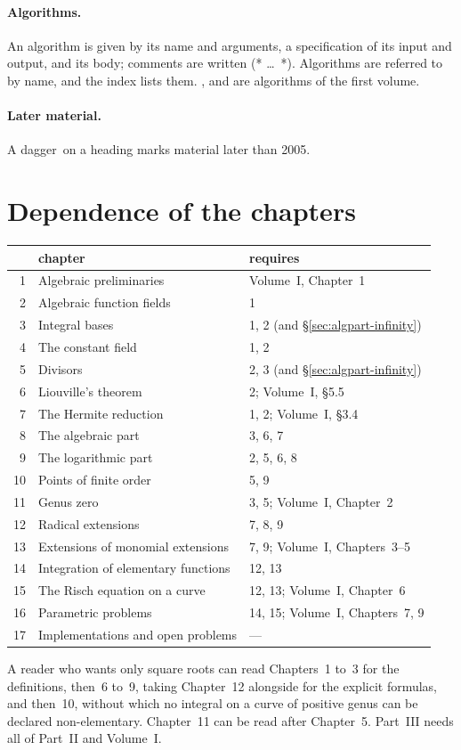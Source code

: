 \paragraph{Algorithms.} An algorithm is given by its name and arguments, a
specification of its input and output, and its body; comments are written
\textup{(* \dots\ *)}. Algorithms are referred to by name, and the index lists
them. ,  and
 are algorithms of the first volume.

\paragraph{Later material.} A dagger\later\ on a heading marks material later
than 2005.

\section*{Dependence of the chapters}

\begin{center}
\begin{tabular}{@{}rll@{}}
\toprule
 & chapter & requires \\
\midrule
1 & Algebraic preliminaries & Volume~I, Chapter~1 \\
2 & Algebraic function fields & 1 \\
3 & Integral bases & 1, 2 (and \S\ref{sec:algpart-infinity}) \\
4 & The constant field & 1, 2 \\
5 & Divisors & 2, 3 (and \S\ref{sec:algpart-infinity}) \\
\midrule
6 & Liouville's theorem & 2; Volume~I, \S5.5 \\
7 & The Hermite reduction & 1, 2; Volume~I, \S3.4 \\
8 & The algebraic part & 3, 6, 7 \\
9 & The logarithmic part & 2, 5, 6, 8 \\
10 & Points of finite order & 5, 9 \\
11 & Genus zero & 3, 5; Volume~I, Chapter~2 \\
12 & Radical extensions & 7, 8, 9 \\
\midrule
13 & Extensions of monomial extensions & 7, 9; Volume~I, Chapters~3--5 \\
14 & Integration of elementary functions & 12, 13 \\
15 & The Risch equation on a curve & 12, 13; Volume~I, Chapter~6 \\
16 & Parametric problems & 14, 15; Volume~I, Chapters~7, 9 \\
17 & Implementations and open problems & --- \\
\bottomrule
\end{tabular}
\end{center}

A reader who wants only square roots can read Chapters~1 to~3 for the
definitions, then~6 to~9, taking Chapter~12 alongside for the explicit
formulas, and then~10, without which no integral on a curve of positive genus
can be declared non-elementary. Chapter~11 can be read after Chapter~5.
Part~III needs all of Part~II and Volume~I.
